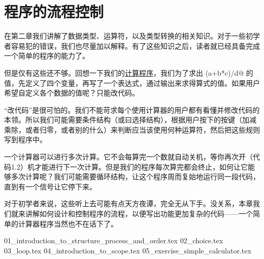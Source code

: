 \chapter{程序的流程控制}
在第二章我们讲解了数据类型、运算符，以及类型转换的相关知识。对于一些初学者容易犯的错误，我们也尽量加以解释。有了这些知识之后，读者就已经具备完成一个简单的程序的能力了。\par
但是仅有这些还不够。回想一下我们的\hyperref[lst:calc1]{计算程序}，我们为了求出 \lstinline@(a+b*c)/d@ 的值，先定义了四个变量，再写了一个表达式，通过输出来求得算式的值。如果用户希望自定义各个数据的值呢？只能改代码。\par
``改代码''是很可怕的。我们不能苛求每个使用计算器的用户都有看懂并修改代码的本领。所以我们可能需要条件结构（或曰选择结构），根据用户按下的按键（加减乘除，或者归零，或者别的什么）来判断应当该使用何种运算符，然后把这些规则写到程序中。\par
一个计算器可以进行多次计算。它不会每算完一个数就自动关机，等你再次开（代码1.2）机才能进行下一次计算。但是我们的程序每次算完都会终止，如何让它能够多次计算呢？我们可能需要循环结构，让这个程序周而复始地运行同一段代码，直到有一个信号让它停下来。\par
对于初学者来说，这些听上去可能有点天方夜谭，完全无从下手。没关系，本章我们就来讲解如何设计和控制程序的流程，以便写出功能更加复杂的代码——一个简单的计算器程序当然也不在话下了。\par
{01_introduction_to_structure_process_and_order.tex}
{02_choice.tex}
{03_loop.tex}
{04_introduction_to_scope.tex}
{05_exercise_simple_calculator.tex}